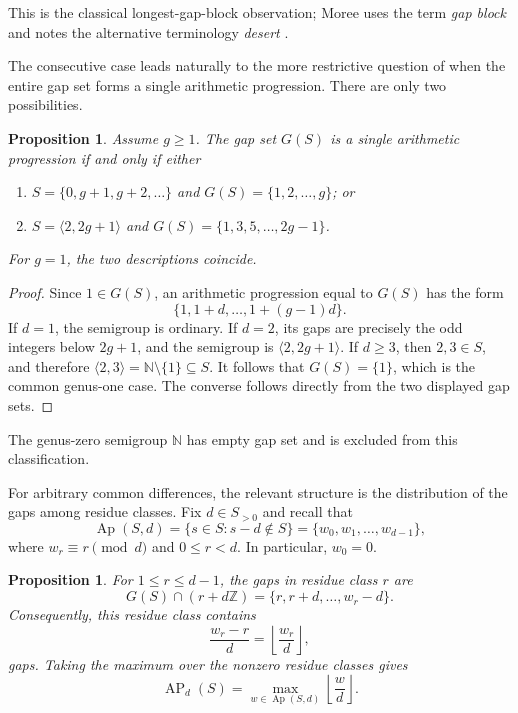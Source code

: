 \documentclass[11pt]{article}
\theoremstyle{plain}
\newtheorem{proposition}[theorem]{Proposition}
\theoremstyle{definition}
\theoremstyle{remark}
\newcommand{\N}{\mathbb N}
\newcommand{\Z}{\mathbb Z}
\newcommand{\Ap}{\operatorname{Ap}}
\newcommand{\AP}{\operatorname{AP}}
\begin{document}
This is the classical longest-gap-block observation; Moree uses the term
\emph{gap block} and notes the alternative terminology \emph{desert}
\cite{moree-gap-blocks}.

The consecutive case leads naturally to the more restrictive question of
when the entire gap set forms a single arithmetic progression.  There are
only two possibilities.

\begin{proposition}\label{prop:gap-set-ap}
Assume $g\geq1$.  The gap set $G(S)$ is a single arithmetic progression if
and only if either
\begin{enumerate}
  \item $S=\{0,g+1,g+2,\ldots\}$ and $G(S)=\{1,2,\ldots,g\}$; or
  \item $S=\langle2,2g+1\rangle$ and
  $G(S)=\{1,3,5,\ldots,2g-1\}$.
\end{enumerate}
For $g=1$, the two descriptions coincide.
\end{proposition}

\begin{proof}
Since $1\in G(S)$, an arithmetic progression equal to $G(S)$ has the form
\[
  \{1,1+d,\ldots,1+(g-1)d\}.
\]
If $d=1$, the semigroup is ordinary.  If $d=2$, its gaps are precisely the
odd integers below $2g+1$, and the semigroup is $\langle2,2g+1\rangle$.
If $d\geq3$, then $2,3\in S$, and therefore
$\langle2,3\rangle=\N\setminus\{1\}\subseteq S$.  It follows that
$G(S)=\{1\}$,
which is the common genus-one case.  The converse follows directly from the
two displayed gap sets.
\end{proof}

The genus-zero semigroup $\N$ has empty gap set and is excluded from this
classification.

For arbitrary common differences, the relevant structure is the distribution
of the gaps among residue classes.  Fix $d\in S_{>0}$ and recall that
\[
  \Ap(S,d)=\{s\in S:s-d\notin S\}
  =\{w_0,w_1,\ldots,w_{d-1}\},
\]
where $w_r\equiv r\pmod d$ and $0\leq r<d$.  In particular, $w_0=0$.

\begin{proposition}\label{prop:apery-residue-gaps}
For $1\leq r\leq d-1$, the gaps in residue class $r$ are
\[
  G(S)\cap(r+d\Z)=\{r,r+d,\ldots,w_r-d\}.
\]
Consequently, this residue class contains
\[
  \frac{w_r-r}{d}=\left\lfloor\frac{w_r}{d}\right\rfloor,
\]
gaps.  Taking the maximum over the nonzero residue classes gives
\[
  \AP_d(S)=\max_{w\in\Ap(S,d)}\left\lfloor\frac wd\right\rfloor.
\]
\end{proposition}
\end{document}
